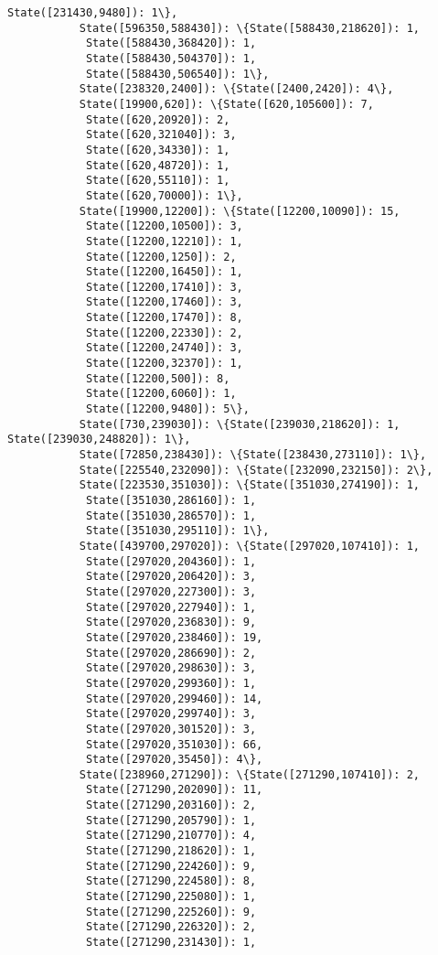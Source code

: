 \documentclass[11pt]{article}
\begin{document}
\begin{Verbatim}[commandchars=\\\{\}]
            State([231430,9480]): 1\},
           State([596350,588430]): \{State([588430,218620]): 1,
            State([588430,368420]): 1,
            State([588430,504370]): 1,
            State([588430,506540]): 1\},
           State([238320,2400]): \{State([2400,2420]): 4\},
           State([19900,620]): \{State([620,105600]): 7,
            State([620,20920]): 2,
            State([620,321040]): 3,
            State([620,34330]): 1,
            State([620,48720]): 1,
            State([620,55110]): 1,
            State([620,70000]): 1\},
           State([19900,12200]): \{State([12200,10090]): 15,
            State([12200,10500]): 3,
            State([12200,12210]): 1,
            State([12200,1250]): 2,
            State([12200,16450]): 1,
            State([12200,17410]): 3,
            State([12200,17460]): 3,
            State([12200,17470]): 8,
            State([12200,22330]): 2,
            State([12200,24740]): 3,
            State([12200,32370]): 1,
            State([12200,500]): 8,
            State([12200,6060]): 1,
            State([12200,9480]): 5\},
           State([730,239030]): \{State([239030,218620]): 1, State([239030,248820]): 1\},
           State([72850,238430]): \{State([238430,273110]): 1\},
           State([225540,232090]): \{State([232090,232150]): 2\},
           State([223530,351030]): \{State([351030,274190]): 1,
            State([351030,286160]): 1,
            State([351030,286570]): 1,
            State([351030,295110]): 1\},
           State([439700,297020]): \{State([297020,107410]): 1,
            State([297020,204360]): 1,
            State([297020,206420]): 3,
            State([297020,227300]): 3,
            State([297020,227940]): 1,
            State([297020,236830]): 9,
            State([297020,238460]): 19,
            State([297020,286690]): 2,
            State([297020,298630]): 3,
            State([297020,299360]): 1,
            State([297020,299460]): 14,
            State([297020,299740]): 3,
            State([297020,301520]): 3,
            State([297020,351030]): 66,
            State([297020,35450]): 4\},
           State([238960,271290]): \{State([271290,107410]): 2,
            State([271290,202090]): 11,
            State([271290,203160]): 2,
            State([271290,205790]): 1,
            State([271290,210770]): 4,
            State([271290,218620]): 1,
            State([271290,224260]): 9,
            State([271290,224580]): 8,
            State([271290,225080]): 1,
            State([271290,225260]): 9,
            State([271290,226320]): 2,
            State([271290,231430]): 1,

\end{Verbatim}
\end{document}
